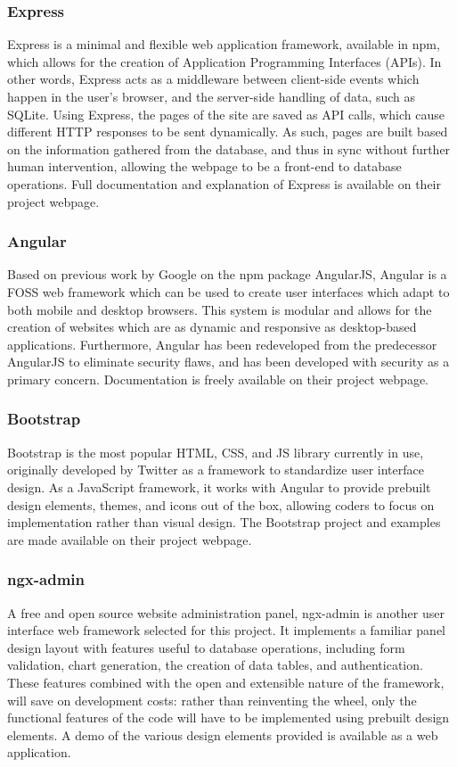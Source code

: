 \documentclass[12pt, letterpaper,oneocolumn]{article}
\begin{document}
		\subsubsection{Express}
		Express is a minimal and flexible web application framework, available in npm, which allows for the creation of Application Programming Interfaces (APIs). In other words, Express acts as a middleware between client-side events which happen in the user's browser, and the server-side handling of data, such as SQLite. Using Express, the pages of the site are saved as API calls, which cause different HTTP responses to be sent dynamically. As such, pages are built based on the information gathered from the database, and thus in sync without further human intervention, allowing the webpage to be a front-end to database operations. Full documentation and explanation of Express is available on their project webpage. \cite{express}
		\subsubsection{Angular}
		Based on previous work by Google on the npm package AngularJS, Angular is a FOSS web framework which can be used to create user interfaces which adapt to both mobile and desktop browsers. This system is modular and allows for the creation of websites which are as dynamic and responsive as desktop-based applications. Furthermore, Angular has been redeveloped from the predecessor AngularJS to eliminate security flaws, and has been developed with security as a primary concern. Documentation is freely available on their project webpage. \cite{angular}
		\subsubsection{Bootstrap}
		Bootstrap is the most popular HTML, CSS, and JS library currently in use, originally developed by Twitter as a framework to standardize user interface design. As a JavaScript framework, it works with Angular to provide prebuilt design elements, themes, and icons out of the box, allowing coders to focus on implementation rather than visual design. The Bootstrap project and examples are made available on their project webpage. \cite{bootstrap}
		\subsubsection{ngx-admin}
		A free and open source website administration panel, ngx-admin is another user interface web framework selected for this project. It implements a familiar panel design layout with features useful to database operations, including form validation, chart generation, the creation of data tables, and authentication. These features combined with the open and extensible nature of the framework, will save on development costs: rather than reinventing the wheel, only the functional features of the code will have to be implemented using prebuilt design elements. A demo of the various design elements provided is available as a web application. \cite{ngx-admin}
\end{document}
